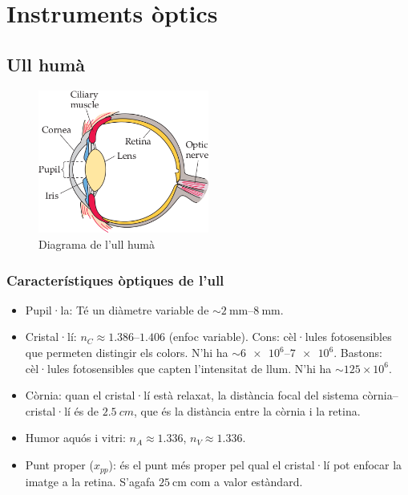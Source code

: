 \section{Instruments òptics}
\subsection{Ull humà}
\begin{figure}[H]
\centering
    \includegraphics[width=0.5\textwidth]{images/5/51-ull.png}
\caption{Diagrama de l'ull humà}
\end{figure}

\subsubsection*{Característiques òptiques de l'ull}
\begin{itemize}
    \item Pupil·la: Té un diàmetre variable de $\sim \SIrange[range-phrase= -]{2}{8}{\mm}$.
    \item Cristal·lí: $n_{C} \approx \numrange[range-phrase = -]{1.386}{1.406}$ (enfoc variable).
        \subitem Cons: cèl·lules fotosensibles que permeten distingir els colors. N'hi ha $\sim \numrange[range-phrase = -]{6e6}{7e6}$.
        \subitem Bastons: cèl·lules fotosensibles que capten l'intensitat de llum. N'hi ha $\sim 125 \times 10^{6}$.
    \item Còrnia: quan el cristal·lí està relaxat, la distància focal del sistema còrnia--cristal·lí és de $\SI{2.5}{cm}$, que és la distància entre la còrnia i la retina.
    \item Humor aquós i vitri: $n_{A} \approx 1.336$, $n_{V}\approx 1.336$.
    \item Punt proper ($x_{pp}$): és el punt més proper pel qual el cristal·lí pot enfocar la imatge a la retina. S'agafa $\SI{25}{\cm}$ com a valor estàndard.
\end{itemize}

